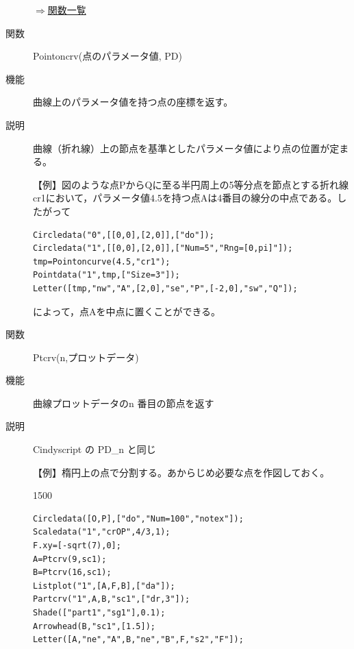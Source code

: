 \documentclass[papersize,a4paper,12pt,uplatex]{jsarticle}
\begin{document}
\begin{description}
\begin{flushright}\hyperlink{functionlist}{$\Rightarrow$関数一覧}\end{flushright}


\vspace{\baselineskip}
\hypertarget{pointoncrv}{}
\item[関数]Pointoncrv(点のパラメータ値, PD)
\item[機能]曲線上のパラメータ値を持つ点の座標を返す。
\item[説明]曲線（折れ線）上の節点を基準としたパラメータ値により点の位置が定まる。

\vspace{\baselineskip}
【例】図のような点$\mathrm{P}$から$\mathrm{Q}$に至る半円周上の5等分点を節点とする折れ線cr1において，パラメータ値$4.5$を持つ点$\mathrm{A}$は4番目の線分の中点である。したがって

\begin{verbatim}
Circledata("0",[[0,0],[2,0]],["do"]);
Circledata("1",[[0,0],[2,0]],["Num=5","Rng=[0,pi]"]);
tmp=Pointoncurve(4.5,"cr1");
Pointdata("1",tmp,["Size=3"]);
Letter([tmp,"nw","A",[2,0],"se","P",[-2,0],"sw","Q"]);
\end{verbatim}

によって，点Aを中点に置くことができる。

\vspace{\baselineskip}
 \begin{center} \scalebox{0.9}{} \end{center}

\hypertarget{ptcrv}{}
\item[関数]Ptcrv(n,プロットデータ)
\item[機能]曲線プロットデータのn 番目の節点を返す
\item[説明]Cindyscript の PD\_n と同じ

\vspace{\baselineskip}
【例】楕円上の点で分割する。あからじめ必要な点を作図しておく。

\begin{layer}{150}{0}
\end{layer}
\begin{verbatim}
Circledata([O,P],["do","Num=100","notex"]);
Scaledata("1","crOP",4/3,1);
F.xy=[-sqrt(7),0];
A=Ptcrv(9,sc1);
B=Ptcrv(16,sc1);
Listplot("1",[A,F,B],["da"]);
Partcrv("1",A,B,"sc1",["dr,3"]);
Shade(["part1","sg1"],0.1);
Arrowhead(B,"sc1",[1.5]);
Letter([A,"ne","A",B,"ne","B",F,"s2","F"]);
\end{verbatim}
 

\end{description}
\end{document}
